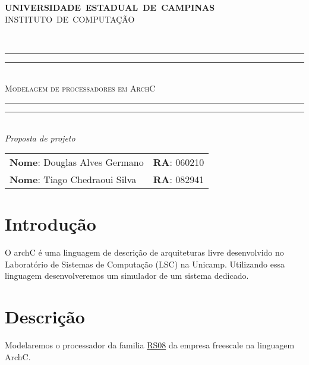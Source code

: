 \documentclass[10pt,a4paper]{article}
\begin{document}
  \thispagestyle{empty}
  
  \begin{minipage}[h]{0.10\linewidth}
  \end{minipage}
  \begin{minipage}[h!]{0.7\linewidth}
    \vspace*{\fill}
    \centering
    {\large \textbf{UNIVERSIDADE~ESTADUAL~DE~CAMPINAS}}\\ 
    {\large INSTITUTO~DE~COMPUTAÇÃO}                   
    \vspace*{\fill} 
  \end{minipage}
    \\\vspace{0.5cm}
  
  \begin{center} 
    \rule{11.0cm}{0.4pt}\vspace*{-\baselineskip}\vspace{-2.0pt}
    \rule{11.0cm}{1.6pt} \vspace*{2.0pt}\\
      {\Large \textsc{Modelagem de processadores em ArchC}}\vspace{-3.2pt}
    \rule{11.0cm}{0.4pt}\vspace*{-\baselineskip}\vspace{3.2pt} \rule{11.0cm}{1.6pt}\\
    {\textsl{Proposta de projeto}}
    \\\vspace{1cm}
    \begin{tabular}{ll}
      \textbf{Nome}: Douglas Alves Germano        &   \textbf{RA}: 060210\\
      \textbf{Nome}: Tiago Chedraoui Silva        &       \textbf{RA}: 082941
      
    \end{tabular}
  \end{center}
  \vspace{0.5cm}
  
  \section*{Introdução}
  
  O archC é uma linguagem de descrição de arquiteturas livre
  desenvolvido no Laboratório de Sistemas de Computação (LSC) na
  Unicamp. Utilizando essa linguagem desenvolveremos um simulador de um sistema dedicado. 
  
  \section*{Descrição}
  Modelaremos o processador da familia \href{http://cache.freescale.com/files/microcontrollers/doc/ref_manual/RS08RM.pdf}{RS08}\cite{FS} da empresa freescale na
  linguagem ArchC.
  
\end{document}
